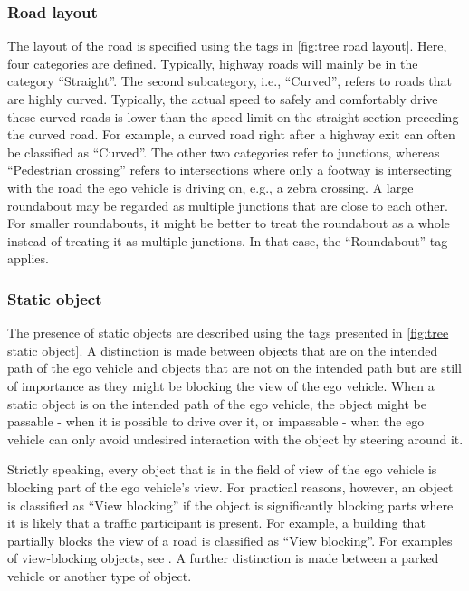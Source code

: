 \subsubsection{Road layout}
\label{sec:road layout}

The layout of the road is specified using the tags in \cref{fig:tree road layout}. Here, four categories are defined. Typically, highway roads will mainly be in the category ``Straight''. The second subcategory, i.e., ``Curved'', refers to roads that are highly curved. Typically, the actual speed to safely and comfortably drive these curved roads is lower than the speed limit on the straight section preceding the curved road. For example, a curved road right after a highway exit can often be classified as ``Curved''. The other two categories refer to junctions, whereas ``Pedestrian crossing'' refers to intersections where only a footway is intersecting with the road the ego vehicle is driving on, e.g., a zebra crossing. A large roundabout may be regarded as multiple junctions that are close to each other. For smaller roundabouts, it might be better to treat the roundabout as a whole instead of treating it as multiple junctions. In that case, the ``Roundabout'' tag applies.



\subsubsection{Static object}
\label{sec:static object}

The presence of static objects are described using the tags presented in \cref{fig:tree static object}. A distinction is made between objects that are on the intended path of the ego vehicle and objects that are not on the intended path but are still of importance as they might be blocking the view of the ego vehicle. When a static object is on the intended path of the ego vehicle, the object might be passable - when it is possible to drive over it, or impassable - when the ego vehicle can only avoid undesired interaction with the object by steering around it.

Strictly speaking, every object that is in the field of view of the ego vehicle is blocking part of the ego vehicle's view. For practical reasons, however, an object is classified as ``View blocking'' if the object is significantly blocking parts where it is likely that a traffic participant is present. For example, a building that partially blocks the view of a road is classified as ``View blocking''. For examples of view-blocking objects, see \cite{CATS2015}. A further distinction is made between a parked vehicle or another type of object.

